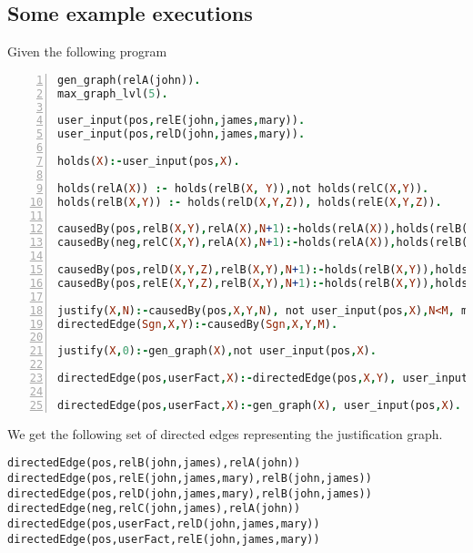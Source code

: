 \documentclass[sigconf]{acmart}
\begin{document}
\subsection{Some example executions}
Given the following program
\begin{lstlisting}[language=Prolog, numbers=left]
gen_graph(relA(john)).
max_graph_lvl(5).

user_input(pos,relE(john,james,mary)).
user_input(pos,relD(john,james,mary)). 

holds(X):-user_input(pos,X).

holds(relA(X)) :- holds(relB(X, Y)),not holds(relC(X,Y)).
holds(relB(X,Y)) :- holds(relD(X,Y,Z)), holds(relE(X,Y,Z)).

causedBy(pos,relB(X,Y),relA(X),N+1):-holds(relA(X)),holds(relB(X, Y)),not holds(relC(X,Y)),justify(relA(X),N).
causedBy(neg,relC(X,Y),relA(X),N+1):-holds(relA(X)),holds(relB(X, Y)),not holds(relC(X,Y)),justify(relA(X),N).

causedBy(pos,relD(X,Y,Z),relB(X,Y),N+1):-holds(relB(X,Y)),holds(relD(X,Y,Z)),holds(relE(X,Y,Z)),justify(relB(X,Y),N).
causedBy(pos,relE(X,Y,Z),relB(X,Y),N+1):-holds(relB(X,Y)),holds(relD(X,Y,Z)),holds(relE(X,Y,Z)),justify(relB(X,Y),N).

justify(X,N):-causedBy(pos,X,Y,N), not user_input(pos,X),N<M, max_graph_lvl(M).
directedEdge(Sgn,X,Y):-causedBy(Sgn,X,Y,M).

justify(X,0):-gen_graph(X),not user_input(pos,X).

directedEdge(pos,userFact,X):-directedEdge(pos,X,Y), user_input(pos,X).

directedEdge(pos,userFact,X):-gen_graph(X), user_input(pos,X).
\end{lstlisting}
We get the following set of directed edges representing the justification graph. 
\begin{verbatim}
directedEdge(pos,relB(john,james),relA(john))
directedEdge(pos,relE(john,james,mary),relB(john,james))
directedEdge(pos,relD(john,james,mary),relB(john,james))
directedEdge(neg,relC(john,james),relA(john))
directedEdge(pos,userFact,relD(john,james,mary))
directedEdge(pos,userFact,relE(john,james,mary))
\end{verbatim}
\end{document}
